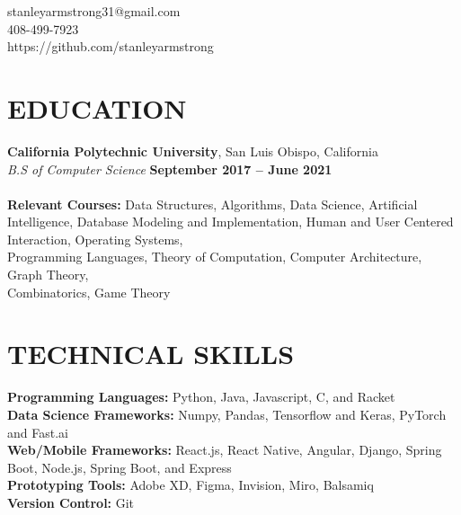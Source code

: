 \documentclass[margin,line]{resume}
\begin{document}
{
    \hfill stanleyarmstrong31@gmail.com       \vspace{0mm}\\\vspace{0mm}%
    \hfill 408-499-7923           \vspace{0mm}\\\vspace{0mm}%
    \hfill https://github.com/stanleyarmstrong \vspace{0mm}\\\vspace{-9mm}%
}

\begin{resume}
    \section{\mysidestyle \textbf{\large{E}\small{DUCATION}}}

    \textbf{\listing California Polytechnic University}, San Luis Obispo, California \vspace{1mm}\\
    \textsl{B.S of Computer Science} \hfill \textbf{September 2017 -- June 2021}\vspace{-3mm}\\\vspace{-1mm}%
    \\
    \textbf{Relevant Courses:} Data Structures, Algorithms, Data Science, Artificial Intelligence, Database Modeling and Implementation, Human and User Centered Interaction, Operating Systems,\\
    Programming Languages, Theory of Computation, Computer Architecture, Graph Theory,\\
    Combinatorics, Game Theory

    \vspace{-1mm}
\sectionline

    \section{\mysidestyle \textbf{\large{T}\small{ECHNICAL }\large{S}\small{KILLS}}}
    \textbf{Programming Languages:} Python, Java, Javascript, C, and Racket\\
    \textbf{Data Science Frameworks:} Numpy, Pandas, Tensorflow and Keras, PyTorch and Fast.ai\\
    \textbf{Web/Mobile Frameworks:} React.js, React Native, Angular, Django, Spring Boot, Node.js, Spring Boot, and Express\\
    \textbf{Prototyping Tools:} Adobe XD, Figma, Invision, Miro, Balsamiq \\
    \textbf{Version Control:} Git


\end{resume}
\end{document}
